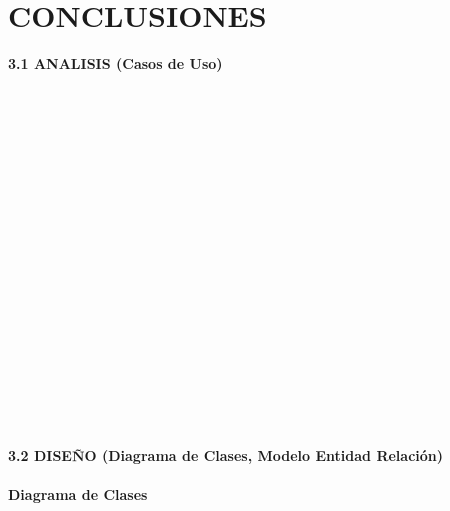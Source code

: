 \section{CONCLUSIONES} 
\begin{flushleft}
\textbf {3.1 ANALISIS (Casos de Uso)}\\

\textbf{}\\
\textbf{}\\
\textbf{}\\
\textbf{}\\
\textbf{}\\
\textbf{}\\
\textbf{}\\
\textbf{}\\
\textbf{}\\
\textbf{}\\
\textbf{}\\
\textbf{}\\
\textbf{}\\
\textbf{}\\
\textbf{}\\
\textbf{}\\
\textbf{}\\
\textbf{}\\
\textbf{}\\
\textbf {3.2 DISEÑO (Diagrama de Clases, Modelo Entidad Relación)}\\
\textbf{}\\
\textbf {Diagrama de Clases}\\
\textbf{}\\
\textbf{}\\
\end{flushleft}